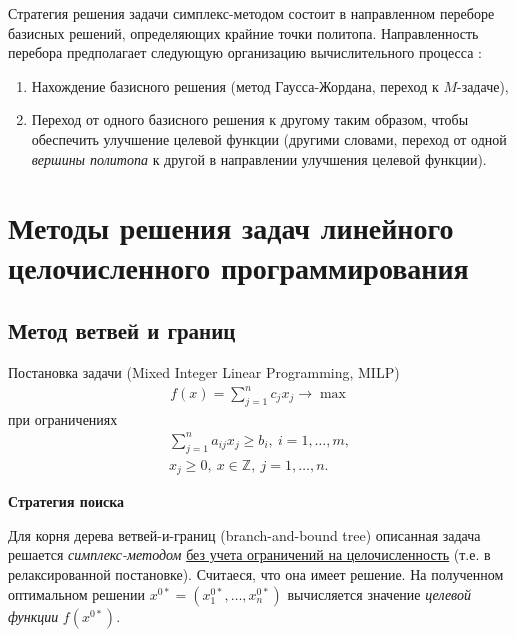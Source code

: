 \documentclass[%
	11pt,
	a4paper,
	utf8,
		]{article}
\begin{document}
Стратегия решения задачи симплекс-методом состоит в направленном переборе базисных решений, определяющих крайние точки политопа. Направленность перебора предполагает следующую организацию вычислительного процесса \cite{panteleev}:
\begin{enumerate}
	\item Нахождение базисного решения (метод Гаусса-Жордана, переход к $ M $-задаче),
	
	\item Переход от одного базисного решения к другому таким образом, чтобы обеспечить улучшение целевой функции (другими словами, переход от одной \emph{вершины политопа} к другой в направлении улучшения целевой функции).
\end{enumerate}






\section{Методы решения задач линейного целочисленного программирования}

\subsection{Метод ветвей и границ}

Постановка задачи (Mixed Integer Linear Programming, MILP)
\begin{align*}
	f(x) = \sum_{j=1}^{n} c_j x_j \rightarrow \max
\end{align*}
при ограничениях
\begin{align*}
	\sum_{j=1}^{n} a_{ij} x_j \geqslant b_i, \ i = 1, \ldots, m,\\
	x_j \geqslant 0, \ x \in \mathbb{Z}, \ j = 1, \ldots, n.
\end{align*}


\textbf{Стратегия поиска}

Для корня дерева ветвей-и-границ (branch-and-bound tree) описанная задача решается \emph{симплекс-методом} \underline{без учета ограничений на целочисленность} (т.е. в релаксированной постановке). Считаеся, что она имеет решение. На полученном оптимальном решении $ x^{0*} = (x_1^{0*}, \ldots, x_n^{0*}) $ вычисляется значение \emph{целевой функции} $ f(x^{0*}) $.
\end{document}
